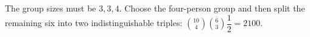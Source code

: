 The group sizes must be $3,3,4$. Choose the four-person group and then split the remaining six into two indistinguishable triples: $\binom{10}{4}\binom{6}{3}\dfrac{1}{2}=\boxed{2100}$.
